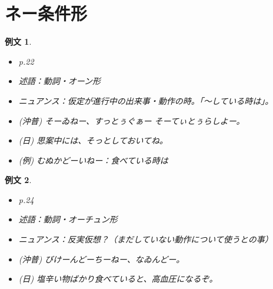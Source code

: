 \documentclass[a4j,12pt]{jarticle}
\theoremstyle{break}
\newtheorem{example}{例文}
\begin{document}
\section{ネー条件形}
\begin{example}
  \begin{itemize}
  \item p.22
  \item 述語：動詞・オーン形
  \item ニュアンス：仮定が進行中の出来事・動作の時。「〜している時は」。
  \item (沖普) そーゐねー、すっとぅぐぁー そーてぃとぅらしよー。
  \item (日) 思案中には、そっとしておいてね。
  \item (例) むぬかどーいねー：食べている時は
  \end{itemize}
\end{example}
\begin{example}
  \begin{itemize}
  \item p.24
  \item 述語：動詞・オーチュン形
  \item ニュアンス：反実仮想？（まだしていない動作について使うとの事）
  \item (沖普) びけーんどーちーねー、なゐんどー。
  \item (日) 塩辛い物ばかり食べていると、高血圧になるぞ。
  \end{itemize}
\end{example}
\end{document}
